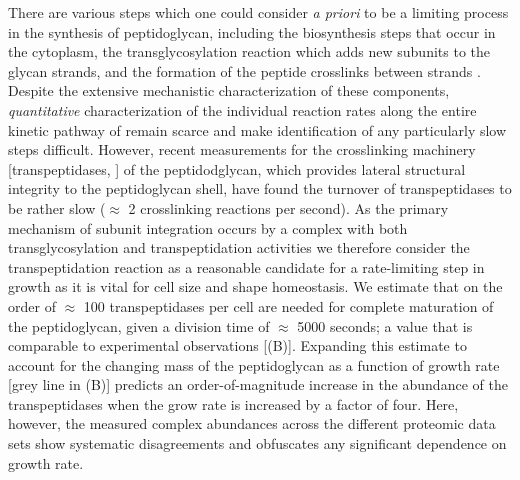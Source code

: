 There are various steps which one could consider \textit{a priori} to be a
limiting process in the synthesis of peptidoglycan, including the biosynthesis
steps that occur in the cytoplasm, the transglycosylation reaction which adds
new subunits to the glycan strands, and the formation of the peptide crosslinks
between strands \citep{shi2018,morgenstein2015,lovering2012,barreteau2008}.
Despite the extensive mechanistic characterization of these components,
\textit{quantitative} characterization of the individual reaction rates along
the entire kinetic pathway of remain scarce and make identification of any
particularly slow steps difficult. However, recent measurements for the
crosslinking machinery [transpeptidases, \cite{catherwood2020}] of the
peptidodglycan, which provides lateral structural integrity to the peptidoglycan
shell, have found the turnover of transpeptidases to be rather slow ($\approx$ 2
crosslinking reactions per second). As the primary mechanism of subunit
integration occurs by a complex with both transglycosylation and
transpeptidation activities \citep{shi2018} we therefore consider the
transpeptidation reaction as a reasonable candidate for a rate-limiting step in
growth as it is vital for cell size and shape homeostasis. We estimate that on
the order of $\approx$ 100 transpeptidases per cell are needed for complete
maturation of the peptidoglycan, given a division time of $\approx$ 5000
seconds; a value that is comparable to experimental observations
[(B)]. Expanding this estimate to account for the
changing mass of the peptidoglycan as a function of growth rate [grey line in
(B)] predicts an order-of-magnitude increase in
the abundance of the transpeptidases when the grow rate is increased by a factor
of four. Here, however, the measured complex abundances across the different
proteomic data sets show systematic disagreements and obfuscates any significant
dependence on growth rate.


